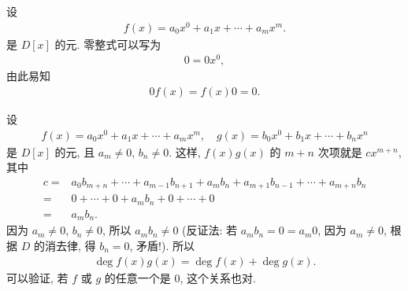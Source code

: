 \begin{example}
    设
    \begin{align*}
        f(x) = a_0 x^0 + a_1 x + \cdots + a_m x^m.
    \end{align*}
    是 $D[x]$ 的元. 零整式可以写为
    \begin{align*}
        0 = 0x^0,
    \end{align*}
    由此易知
    \begin{align*}
        0f(x) = f(x)0 = 0.
    \end{align*}
\end{example}

\begin{remark}
    设
    \begin{align*}
        f(x) = a_0 x^0 + a_1 x + \cdots + a_m x^m, \quad g(x) = b_0 x^0 + b_1 x + \cdots + b_n x^n
    \end{align*}
    是 $D[x]$ 的元, 且 $a_m \neq 0$, $b_n \neq 0$. 这样, $f(x)g(x)$ 的 $m+n$ 次项就是 $cx^{m+n}$, 其中
    \begin{align*}
        c
        = {} & a_0 b_{m+n} + \cdots + a_{m-1} b_{n+1} + a_m b_n + a_{m+1} b_{n-1} + \cdots + a_{m+n}b_n \\
        = {} & 0 + \cdots + 0 + a_m b_n + 0 + \cdots + 0                                                \\
        = {} & a_m b_n.
    \end{align*}
    因为 $a_m \neq 0$, $b_n \neq 0$, 所以 $a_m b_n \neq 0$ (反证法: 若 $a_m b_n = 0 = a_m 0$, 因为 $a_m \neq 0$, 根据 $D$ 的消去律, 得 $b_n = 0$, 矛盾!). 所以
    \begin{align*}
        \deg f(x) g(x) = \deg f(x) + \deg g(x).
    \end{align*}
    可以验证, 若 $f$ 或 $g$ 的任意一个是 $0$, 这个关系也对.
\end{remark}

